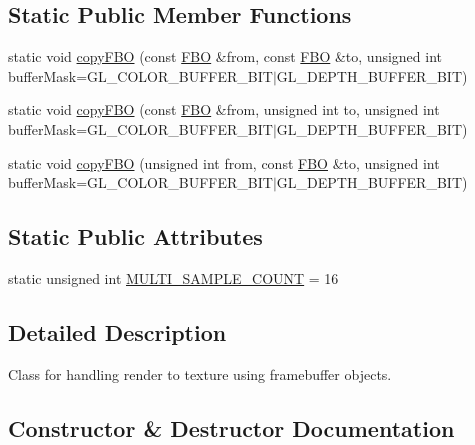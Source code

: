 \subsection*{Static Public Member Functions}
\begin{DoxyCompactItemize}
\item 
static void \mbox{\hyperlink{class_f_b_o_addf89df1a720d8dd34594ac87e21ca03}{copy\+F\+BO}} (const \mbox{\hyperlink{class_f_b_o}{F\+BO}} \&from, const \mbox{\hyperlink{class_f_b_o}{F\+BO}} \&to, unsigned int buffer\+Mask=G\+L\+\_\+\+C\+O\+L\+O\+R\+\_\+\+B\+U\+F\+F\+E\+R\+\_\+\+B\+IT$\vert$G\+L\+\_\+\+D\+E\+P\+T\+H\+\_\+\+B\+U\+F\+F\+E\+R\+\_\+\+B\+IT)
\item 
static void \mbox{\hyperlink{class_f_b_o_ad01c27b4426d49ee55ec9c2734291fe2}{copy\+F\+BO}} (const \mbox{\hyperlink{class_f_b_o}{F\+BO}} \&from, unsigned int to, unsigned int buffer\+Mask=G\+L\+\_\+\+C\+O\+L\+O\+R\+\_\+\+B\+U\+F\+F\+E\+R\+\_\+\+B\+IT$\vert$G\+L\+\_\+\+D\+E\+P\+T\+H\+\_\+\+B\+U\+F\+F\+E\+R\+\_\+\+B\+IT)
\item 
static void \mbox{\hyperlink{class_f_b_o_a813e10a4d1dadeb29c781419c6c5a8dd}{copy\+F\+BO}} (unsigned int from, const \mbox{\hyperlink{class_f_b_o}{F\+BO}} \&to, unsigned int buffer\+Mask=G\+L\+\_\+\+C\+O\+L\+O\+R\+\_\+\+B\+U\+F\+F\+E\+R\+\_\+\+B\+IT$\vert$G\+L\+\_\+\+D\+E\+P\+T\+H\+\_\+\+B\+U\+F\+F\+E\+R\+\_\+\+B\+IT)
\end{DoxyCompactItemize}
\subsection*{Static Public Attributes}
\begin{DoxyCompactItemize}
\item 
static unsigned int \mbox{\hyperlink{class_f_b_o_ac1a0e5bfd75a342c885ff5a90d8f4677}{M\+U\+L\+T\+I\+\_\+\+S\+A\+M\+P\+L\+E\+\_\+\+C\+O\+U\+NT}} = 16
\end{DoxyCompactItemize}


\subsection{Detailed Description}
Class for handling render to texture using framebuffer objects. 



\subsection{Constructor \& Destructor Documentation}
\mbox{\label{class_f_b_o_a2948b029f198e0298617ce7749ebce07}} 
